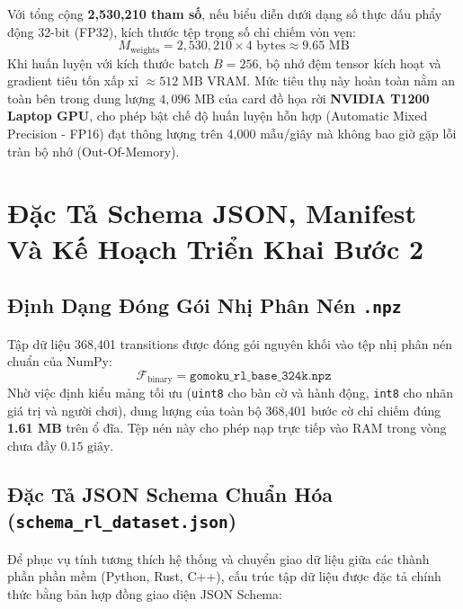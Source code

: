 \documentclass[11pt,a4paper]{report}
\begin{document}
\begin{tcolorbox}[title={Đánh giá khả thi phần cứng trên GPU NVIDIA T1200 Laptop (4GB VRAM)}]
Với tổng cộng \textbf{2,530,210 tham số}, nếu biểu diễn dưới dạng số thực dấu phẩy động 32-bit (FP32), kích thước tệp trọng số chỉ chiếm vỏn vẹn:
\begin{equation}
    M_{\text{weights}} = 2{,}530{,}210 \times 4\text{ bytes} \approx 9.65\text{ MB}
\end{equation}
Khi huấn luyện với kích thước batch $B = 256$, bộ nhớ đệm tensor kích hoạt và gradient tiêu tốn xấp xỉ $\approx 512\text{ MB}$ VRAM. Mức tiêu thụ này hoàn toàn nằm an toàn bên trong dung lượng $4{,}096\text{ MB}$ của card đồ họa rời \textbf{NVIDIA T1200 Laptop GPU}, cho phép bật chế độ huấn luyện hỗn hợp (Automatic Mixed Precision - FP16) đạt thông lượng trên 4,000 mẫu/giây mà không bao giờ gặp lỗi tràn bộ nhớ (Out-Of-Memory).
\end{tcolorbox}

\chapter{Đặc Tả Schema JSON, Manifest Và Kế Hoạch Triển Khai Bước 2}

\section{Định Dạng Đóng Gói Nhị Phân Nén \texttt{.npz}}

Tập dữ liệu 368,401 transitions được đóng gói nguyên khối vào tệp nhị phân nén chuẩn của NumPy:
\begin{equation}
    \mathcal{F}_{\text{binary}} = \texttt{gomoku\_rl\_base\_324k.npz}
\end{equation}
Nhờ việc định kiểu mảng tối ưu (\texttt{uint8} cho bàn cờ và hành động, \texttt{int8} cho nhãn giá trị và người chơi), dung lượng của toàn bộ 368,401 bước cờ chỉ chiếm đúng \textbf{1.61 MB} trên ổ đĩa. Tệp nén này cho phép nạp trực tiếp vào RAM trong vòng chưa đầy $0.15\text{ giây}$.

\section{Đặc Tả JSON Schema Chuẩn Hóa (\texttt{schema\_rl\_dataset.json})}

Để phục vụ tính tương thích hệ thống và chuyển giao dữ liệu giữa các thành phần phần mềm (Python, Rust, C++), cấu trúc tập dữ liệu được đặc tả chính thức bằng bản hợp đồng giao diện JSON Schema:
\end{document}
